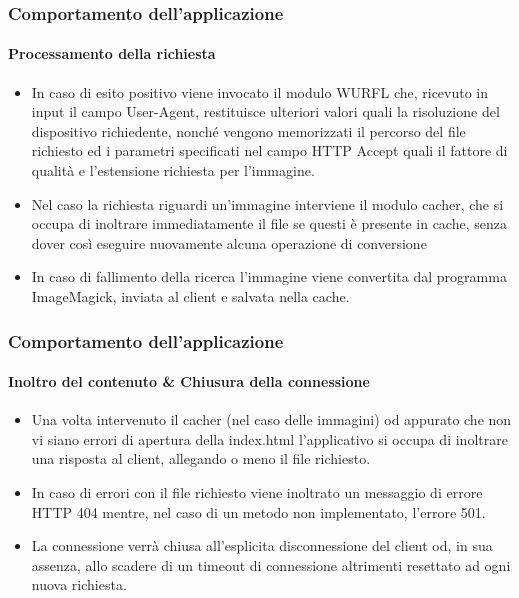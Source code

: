 \documentclass{beamer}
\begin{document}
\begin{frame}
\frametitle{Comportamento dell'applicazione}
\framesubtitle{Processamento della richiesta}

\begin{itemize}

\item In caso di esito positivo viene invocato il modulo WURFL che, ricevuto in input
il campo User-Agent, restituisce ulteriori valori quali la risoluzione del
dispositivo richiedente, nonché vengono memorizzati il percorso del file richiesto
ed i parametri specificati nel campo HTTP Accept quali il fattore di qualità e
l’estensione richiesta per l’immagine.

\item Nel caso la richiesta riguardi un’immagine interviene il modulo cacher, che si
occupa di inoltrare immediatamente il file se questi è presente in cache, senza
dover così eseguire nuovamente alcuna operazione di conversione

\item In caso di
fallimento
della
ricerca
l’immagine
viene
convertita
dal
programma
ImageMagick, inviata al client e salvata nella cache.
\end{itemize}
\end{frame}



\begin{frame}
\frametitle{Comportamento dell'applicazione}
\framesubtitle{Inoltro del contenuto \& Chiusura della connessione}
\begin{itemize}
\item Una volta intervenuto il cacher (nel caso delle immagini) od appurato che non vi
siano errori di apertura della index.html l’applicativo si occupa di inoltrare una
risposta al client, allegando o meno il file richiesto.

\item In caso di errori con il file
richiesto viene inoltrato un messaggio di errore HTTP 404 mentre, nel caso di un
metodo non implementato, l’errore 501.

\item La connessione verrà chiusa all’esplicita disconnessione del client od, in sua
assenza, allo scadere di un timeout di connessione altrimenti resettato ad ogni
nuova richiesta.
\end{itemize}
\end{frame}
\end{document}
